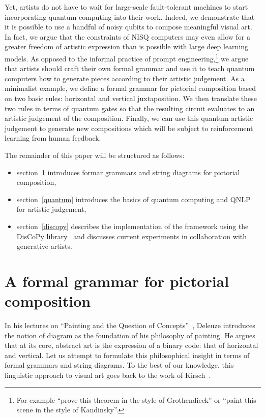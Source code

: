 Yet, artists do not have to wait for large-scale fault-tolerant machines to start incorporating quantum computing into their work.
Indeed, we demonstrate that it is possible to use a handful of noisy qubits to compose meaningful visual art.
In fact, we argue that the constraints of NISQ computers may even allow for a greater freedom of artistic expression than is possible with large deep learning models.
As opposed to the informal practice of prompt engineering,\footnote
{For example ``prove this theorem in the style of Grothendieck'' or ``paint this scene in the style of Kandinsky''.} we argue that artists should craft their own formal grammar and use it to teach quantum computers how to generate pieces according to their artistic judgement.
As a minimalist example, we define a formal grammar for pictorial composition based on two basic rules: horizontal and vertical juxtaposition.
We then translate these two rules in terms of quantum gates so that the resulting circuit evaluates to an artistic judgement of the composition.
Finally, we can use this quantum artistic judgement to generate new compositions which will be subject to reinforcement learning from human feedback.

The remainder of this paper will be structured as follows:
\begin{itemize}
\item section~\ref{grammar} introduces formar grammars and string diagrams for pictorial composition,
\item section~\ref{quantum} introduces the basics of quantum computing and QNLP for artistic judgement,
\item section~\ref{discopy} describes the implementation of the framework using the DisCoPy library~\cite{DeFeliceEtAl20} and discusses current experiments in collaboration with generative artists.
\end{itemize}

\section{A formal grammar for pictorial composition}\label{grammar}

In his lectures on ``Painting and the Question of Concepts''~\cite{Deleuze81}, Deleuze introduces the notion of diagram as the foundation of his philosophy of painting.
He argues that at its core, abstract art is the expression of a binary code: that of horizontal and vertical.
Let us attempt to formulate this philosophical insight in terms of formal grammars and string diagrams.
To the best of our knowledge, this linguistic approach to visual art goes back to the work of Kirsch~\cite{Kirsch64,KirschKirsch86,KirschKirsch88}.

